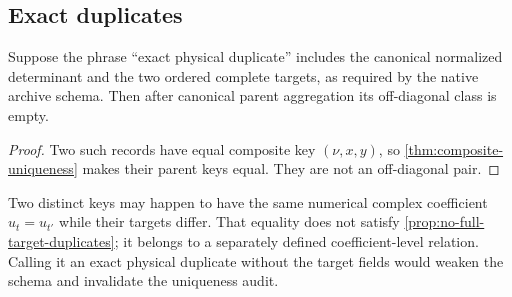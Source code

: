 \subsection{Exact duplicates}

\begin{proposition}
\label{prop:no-full-target-duplicates}
Suppose the phrase ``exact physical duplicate'' includes the
canonical normalized determinant and the two ordered complete targets,
as required by the native archive schema.  Then after canonical parent
aggregation its off-diagonal class is empty.
\end{proposition}

\begin{proof}
Two such records have equal composite key \((\nu,x,y)\), so
\cref{thm:composite-uniqueness} makes their parent keys equal.  They
are not an off-diagonal pair.
\end{proof}

\begin{remark}
Two distinct keys may happen to have the same numerical complex
coefficient \(u_t=u_{t'}\) while their targets differ.  That equality
does not satisfy \cref{prop:no-full-target-duplicates}; it belongs to
a separately defined coefficient-level relation.  Calling it an exact
physical duplicate without the target fields would weaken the schema
and invalidate the uniqueness audit.
\end{remark}
